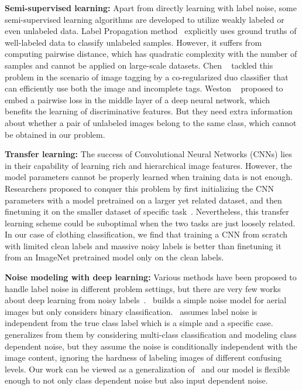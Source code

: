 \documentclass[10pt,twocolumn,letterpaper]{article}
\begin{document}
{\bf Semi-supervised learning:} Apart from directly learning with label noise, some semi-supervised learning algorithms are developed to utilize weakly labeled or even unlabeled data. Label Propagation method~\cite{zhu2002learning} explicitly uses ground truths of well-labeled data to classify unlabeled samples. However, it suffers from computing pairwise distance, which has quadratic complexity with the number of samples and cannot be applied on large-scale datasets. Chen \etal~\cite{chen2013fast} tackled this problem in the scenario of image tagging by a co-regularized duo classifier that can efficiently use both the image and incomplete tags. Weston \etal~\cite{weston2012deep} proposed to embed a pairwise loss in the middle layer of a deep neural network, which benefits the learning of discriminative features. But they need extra information about whether a pair of unlabeled images belong to the same class, which cannot be obtained in our problem.

{\bf Transfer learning:} The success of Convolutional Neural Networks (CNNs) lies in their capability of learning rich and hierarchical image features. However, the model parameters cannot be properly learned when training data is not enough. Researchers proposed to conquer this problem by first initializing the CNN parameters with a model pretrained on a larger yet related dataset, and then finetuning it on the smaller dataset of specific task~\cite{krizhevsky2012imagenet, oquab2013learning, azizpour2014generic,donahue2013decaf}. Nevertheless, this transfer learning scheme could be suboptimal when the two tasks are just loosely related. In our case of clothing classification, we find that training a CNN from scratch with limited clean labels and massive noisy labels is better than finetuning it from an ImageNet pretrained model only on the clean labels.

{\bf Noise modeling with deep learning:} Various methods have been proposed to handle label noise in different problem settings, but there are very few works about deep learning from noisy labels~\cite{mnih2012learning, larsen1998design, sukhbaatar2014learning}.~\cite{mnih2012learning} builds a simple noise model for aerial images but only considers binary classification.~\cite{larsen1998design} assumes label noise is independent from the true class label which is a simple and a specific case.~\cite{sukhbaatar2014learning} generalizes from them by considering multi-class classification and modeling class dependent noise, but they assume the noise is conditionally independent with the image content, ignoring the hardness of labeling images of different confusing levels. Our work can be viewed as a generalization of~\cite{sukhbaatar2014learning,natarajan2013learning} and our model is flexible enough to not only class dependent noise but also input dependent noise.
\end{document}
